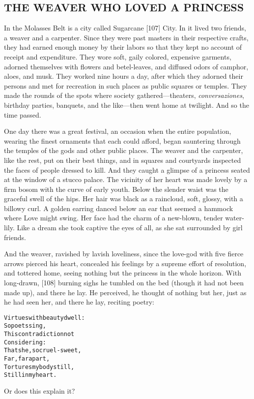\documentclass{article}
\renewenvironment{verbatim}{\begin{alltt}\normalfont\begin{centering}}{\end{centering}\end{alltt}}
\begin{document}
\subsection{THE WEAVER WHO LOVED A PRINCESS}

In the Molasses Belt is a city called Sugarcane [107] City. In it
lived two friends, a weaver and a carpenter. Since they were past
masters in their respective crafts, they had earned enough money by
their labors so that they kept no account of receipt and
expenditure. They wore soft, gaily colored, expensive garments,
adorned themselves with flowers and betel-leaves, and diffused
odors of camphor, aloes, and musk. They worked nine hours a day,
after which they adorned their persons and met for recreation in
such places as public squares or temples. They made the rounds of
the spots where society gathered---theaters, \emph{conversaziones},
birthday parties, banquets, and the like---then went home at
twilight. And so the time passed.

One day there was a great festival, an occasion when the entire
population, wearing the finest ornaments that each could afford,
began sauntering through the temples of the gods and other public
places. The weaver and the carpenter, like the rest, put on their
best things, and in squares and courtyards inspected the faces of
people dressed to kill. And they caught a glimpse of a princess
seated at the window of a stucco palace. The vicinity of her heart
was made lovely by a firm bosom with the curve of early youth.
Below the slender waist was the graceful swell of the hips. Her
hair was black as a raincloud, soft, glossy, with a billowy curl. A
golden earring danced below an ear that seemed a hammock where Love
might swing. Her face had the charm of a new-blown, tender
water-lily. Like a dream she took captive the eyes of all, as she
sat surrounded by girl friends.

And the weaver, ravished by lavish loveliness, since the love-god
with five fierce arrows pierced his heart, concealed his feelings
by a supreme effort of resolution, and tottered home, seeing
nothing but the princess in the whole horizon. With long-drawn,
[108] burning sighs he tumbled on the bed (though it had not been
made up), and there he lay. He perceived, he thought of nothing but
her, just as he had seen her, and there he lay, reciting poetry:

\begin{verbatim}
Virtues with beauty dwell:
    So poets sing,
This contradiction not
    Considering:
That she, so cruel-sweet,
    Far, far apart,
Tortures my body still,
    Still in my heart.
\end{verbatim}
Or does this explain it?
\end{document}
